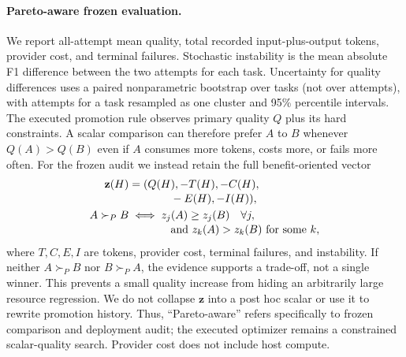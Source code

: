 \paragraph{Pareto-aware frozen evaluation.}
We report all-attempt mean quality, total recorded input-plus-output tokens,
provider cost, and terminal failures. Stochastic instability is the mean
absolute F1 difference between the two attempts for each task. Uncertainty for
quality differences uses a paired nonparametric bootstrap over tasks (not over
attempts), with attempts for a task resampled as one cluster and 95\% percentile
intervals. The executed promotion rule observes primary quality $Q$ plus its
hard constraints. A scalar comparison can therefore prefer $A$ to $B$ whenever
$Q(A)>Q(B)$ even if $A$ consumes more tokens, costs more, or fails more often.
For the frozen audit we instead retain the full benefit-oriented vector
\begin{equation}
\begin{aligned}
 \mathbf{z}(H)&=(Q(H),-T(H),-C(H),\\[-2pt]
 &\hspace{3.8em}-E(H),-I(H)),\\
 A\succ_P B&\iff z_j(A)\ge z_j(B)\quad\forall j,\\[-2pt]
 &\hspace{3.8em}\text{and }z_k(A)>z_k(B)\text{ for some }k,
\end{aligned}
 \label{eq:pareto-audit}
\end{equation}
where $T,C,E,I$ are tokens, provider cost, terminal failures, and instability.
If neither $A\succ_P B$ nor $B\succ_P A$, the evidence supports a trade-off,
not a single winner. This prevents a small quality increase from hiding an
arbitrarily large resource regression. We do not collapse $\mathbf{z}$ into a
post hoc scalar or use it to rewrite promotion history. Thus, ``Pareto-aware''
refers specifically to frozen comparison and deployment audit; the executed
optimizer remains a constrained scalar-quality search. Provider cost does not
include host compute.
